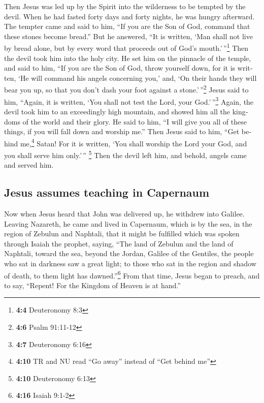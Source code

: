 \begin{paracol}{2}
\begin{otherlanguage}{english}
 Then Jesus was led up by the Spirit into the wilderness
to be tempted by the devil.  When he had fasted forty days
and forty nights, he was hungry afterward.  The tempter
came and said to him, ``If you are the Son of God, command that these
stones become bread.''  But he answered, ``It is written,
`Man shall not live by bread alone, but by every word that proceeds out
of God's mouth.'\,''\footnote{\textbf{4:4} Deuteronomy 8:3}
 Then the devil took him into the holy city. He set him on
the pinnacle of the temple,  and said to him, ``If you are
the Son of God, throw yourself down, for it is written, `He will command
his angels concerning you,' and, `On their hands they will bear you up,
so that you don't dash your foot against a stone.'\,''\footnote{\textbf{4:6}
  Psalm 91:11-12}  Jesus said to him, ``Again, it is
written, `You shall not test the Lord, your God.'\,''\footnote{\textbf{4:7}
  Deuteronomy 6:16}  Again, the devil took him to an
exceedingly high mountain, and showed him all the kingdoms of the world
and their glory.  He said to him, ``I will give you all of
these things, if you will fall down and worship me.'' 
Then Jesus said to him, ``Get behind me,\footnote{\textbf{4:10} TR and
  NU read ``Go away'' instead of ``Get behind me''} Satan! For it is
written, `You shall worship the Lord your God, and you shall serve him
only.'\,'' \footnote{\textbf{4:10} Deuteronomy 6:13} 
Then the devil left him, and behold, angels came and served him.

\hypertarget{jesus-assumes-teaching-in-capernaum}{%
\subsection{Jesus assumes teaching in
Capernaum}\label{jesus-assumes-teaching-in-capernaum}}

 Now when Jesus heard that John was delivered up, he
withdrew into Galilee.  Leaving Nazareth, he came and
lived in Capernaum, which is by the sea, in the region of Zebulun and
Naphtali,  that it might be fulfilled which was spoken
through Isaiah the prophet, saying,  ``The land of
Zebulun and the land of Naphtali, toward the sea, beyond the Jordan,
Galilee of the Gentiles,  the people who sat in darkness
saw a great light; to those who sat in the region and shadow of death,
to them light has dawned.''\footnote{\textbf{4:16} Isaiah 9:1-2}
 From that time, Jesus began to preach, and to say,
``Repent! For the Kingdom of Heaven is at hand.''


\end{otherlanguage}
\end{paracol}
